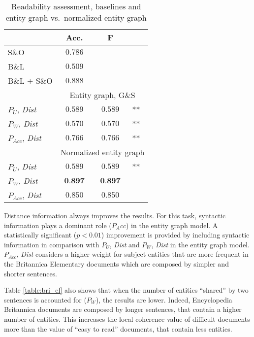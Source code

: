 \begin{table}[!t]
\centering
\begin{small}
\begin{tabular}{l|cc@{}l} 
  & Acc. & F  &\\\hline
  S\&O & $0.786$ & &\\
  B\&L & $0.509$ &  &\\
  B\&L $+$ S\&O & $0.888$ & &\\\hline

  & \multicolumn{3}{|c}{Entity graph, G\&S} \\\hline 

  $P_U$, \textit{Dist} & $0.589$ & $0.589$ &**  \\
  $P_W$, \textit{Dist} &  $0.570$ & $0.570$ &**  \\
  $P_{Acc}$, \textit{Dist} & $0.766$ & $0.766$ &** \\\hline 
	& \multicolumn{3}{|c}{Normalized entity graph} \\\hline 

  $P_U$, \textit{Dist} & $0.589$ & $0.589$&**  \\

  $P_W$, \textit{Dist} & $\textbf{0.897}$ & $\textbf{0.897}$&  \\
  $P_{Acc}$, \textit{Dist} & $0.850$ & $0.850$&

\end{tabular}
\end{small}
\caption{Readability assessment, baselines and entity graph vs.\
  normalized entity graph}
\label{table:bri_ele}
\end{table}


Distance information always improves the results. 
For this task, syntactic information plays a dominant role ($P_Acc$) in the entity graph model.
A statistically significant ($p < 0.01$)  improvement is provided by including syntactic information in comparison with $P_U$, \textit{Dist} and $P_W$, \textit{Dist} in the entity graph model.   
$P_{Acc}$, \textit{Dist} considers a higher weight for subject entities that are more frequent in the Britannica Elementary documents which are composed by simpler and shorter sentences.


Table \ref{table:bri_el} also shows that when the number of entities ``shared” by two sentences is accounted for ($P_W$), the results are lower. 
Indeed, Encyclopedia Britannica documents are composed by longer sentences, that contain a higher number of entities. 
This increases the local coherence value of difficult documents more than the value of “easy to read” documents, that contain less entities. 

